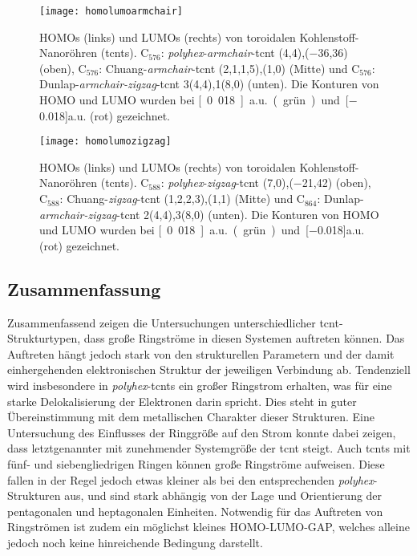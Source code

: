 \begin{figure}[ht!]
	\centering
	\texttt{[image: homolumoarmchair]}
	\captionsetup{figurewithin = chapter}
	\captionsetup{font=small, labelfont=bf}\caption[HOMO und LUMO von toroidalen Kohlenstoff-Nanoröhren 1]{HOMOs (links) und LUMOs (rechts) von toroidalen Kohlenstoff-Nanoröhren (\acp{tcnt}). C$_{576}$: \textit{polyhex}-\textit{armchair}-\ac{tcnt} (4,4),($-$36,36) (oben), C$_{576}$: Chuang-\textit{armchair}-\ac{tcnt} (2,1,1,5),(1,0) (Mitte) und C$_{576}$: Dunlap-\textit{armchair-zigzag}-\ac{tcnt} 3(4,4),1(8,0) (unten). Die Konturen von HOMO und LUMO wurden bei \unit[0.018]{a.u.} (grün) und \unit[$-$0.018]{a.u.} (rot) gezeichnet.}
\label{abb:homolumoarmchair}
\end{figure}

\begin{figure}[ht!]
	\centering
	\texttt{[image: homolumozigzag]}
	\captionsetup{figurewithin = chapter}
	\captionsetup{font=small, labelfont=bf}\caption[HOMO und LUMO von toroidalen Kohlenstoff-Nanoröhren 2]{HOMOs (links) und LUMOs (rechts) von toroidalen Kohlenstoff-Nanoröhren (\acp{tcnt}). C$_{588}$: \textit{polyhex}-\textit{zigzag}-\ac{tcnt} (7,0),($-$21,42) (oben), C$_{588}$: Chuang-\textit{zigzag}-\ac{tcnt} (1,2,2,3),(1,1) (Mitte) und C$_{864}$: Dunlap-\textit{armchair-zigzag}-\ac{tcnt} 2(4,4),3(8,0) (unten). Die Konturen von HOMO und LUMO wurden bei \unit[0.018]{a.u.} (grün) und \unit[$-$0.018]{a.u.} (rot) gezeichnet.}
\label{abb:homolumozigzag}
\end{figure}

\FloatBarrier
\subsection{Zusammenfassung}
Zusammenfassend zeigen die Untersuchungen unterschiedlicher \ac{tcnt}-Strukturtypen, dass große Ringströme in diesen Systemen auftreten können. Das Auftreten hängt jedoch stark von den strukturellen Parametern und der damit einhergehenden elektronischen Struktur der jeweiligen Verbindung ab. Tendenziell wird insbesondere in \textit{polyhex}-\acp{tcnt} ein großer Ringstrom erhalten, was für eine starke Delokalisierung der Elektronen darin spricht. Dies steht in guter Übereinstimmung mit dem metallischen Charakter dieser Strukturen. Eine Untersuchung des Einflusses der Ringgröße auf den Strom konnte dabei zeigen, dass letztgenannter mit zunehmender Systemgröße der \ac{tcnt} steigt. Auch \acp{tcnt} mit fünf- und siebengliedrigen Ringen können große Ringströme aufweisen. Diese fallen in der Regel jedoch etwas kleiner als bei den entsprechenden \textit{polyhex}-Strukturen aus, und sind stark abhängig von der Lage und Orientierung der pentagonalen und heptagonalen Einheiten. Notwendig für das Auftreten von Ringströmen ist zudem ein möglichst kleines HOMO-LUMO-GAP, welches alleine jedoch noch keine hinreichende Bedingung darstellt.


